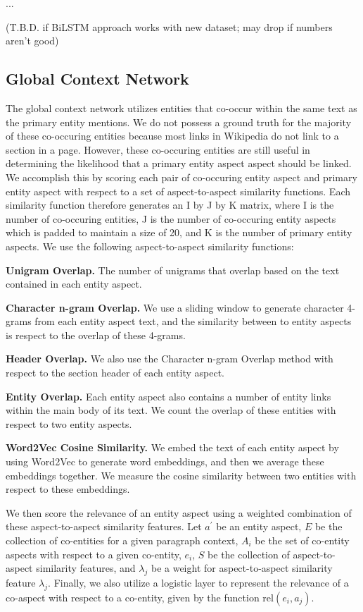 \documentclass[sigconf,authordraft]{acmart}
\begin{document}
...
 
 (T.B.D. if BiLSTM approach works with new dataset; may drop if numbers aren't good)
 
 \subsection{Global Context Network}
The global context network utilizes entities that co-occur within the same text as the primary entity mentions. We do not possess a ground truth for the majority of these co-occuring entities because most links in Wikipedia do not link to a section in a page. However, these co-occuring entities are still useful in determining the likelihood that a primary entity aspect aspect should be linked. 
We accomplish this by scoring each pair of co-occuring entity aspect and primary entity aspect with respect to a set of aspect-to-aspect similarity functions. Each similarity function therefore generates an I by J by K matrix, where I is the number of co-occuring entities, J is the number of co-occuring entity aspects which is padded to maintain a size of 20, and K is the number of primary entity aspects. We use the following aspect-to-aspect similarity functions:

\textbf{Unigram Overlap.} The number of unigrams that overlap based on the text contained in each entity aspect.


\textbf{Character n-gram Overlap.} We use a sliding window to generate character 4-grams from each entity aspect text, and the similarity between to entity aspects is respect to the overlap of these 4-grams.

\textbf{Header Overlap.}
We also use the Character n-gram Overlap method with respect to the section header of each entity aspect.

\textbf{Entity Overlap.}
Each entity aspect also contains a number of entity links within the main body of its text. We count the overlap of these entities with respect to two entity aspects.

\textbf{Word2Vec Cosine Similarity.} 
We embed the text of each entity aspect by using Word2Vec to generate word embeddings, and then we average these embeddings together. We measure the cosine similarity between two entities with respect to these embeddings.

We then score the relevance of an entity aspect using a weighted combination of these aspect-to-aspect similarity features.  
Let $a^{'}$ be an entity aspect, $E$ be the collection of co-entities for a given paragraph context, $A_i$ be the set of co-entity aspects with respect to a given co-entity, $e_i$, $S$ be the collection of aspect-to-aspect similarity features, and $\lambda_j$ be a weight for aspect-to-aspect similarity feature $\lambda_j$. Finally, we also utilize a logistic layer to represent the relevance of a co-aspect with respect to a co-entity, given by the function $\text{rel}(e_i, a_j)$. 
\end{document}
